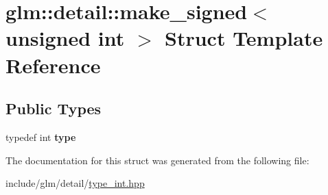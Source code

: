 \hypertarget{structglm_1_1detail_1_1make__signed_3_01unsigned_01int_01_4}{}\section{glm\+:\+:detail\+:\+:make\+\_\+signed$<$ unsigned int $>$ Struct Template Reference}
\label{structglm_1_1detail_1_1make__signed_3_01unsigned_01int_01_4}
\subsection*{Public Types}
\begin{DoxyCompactItemize}
\item 
\mbox{\label{structglm_1_1detail_1_1make__signed_3_01unsigned_01int_01_4_a78b4ada342bba40027f755d20eae141a}} 
typedef int {\bfseries type}
\end{DoxyCompactItemize}


The documentation for this struct was generated from the following file\+:\begin{DoxyCompactItemize}
\item 
include/glm/detail/\hyperlink{type__int_8hpp}{type\+\_\+int.\+hpp}\end{DoxyCompactItemize}
